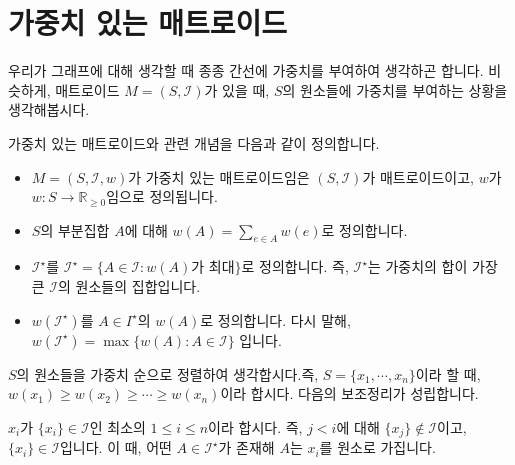\documentclass[11pt, a4paper]{book}
\newcommand{\I}{\mathcal{I}}
\begin{document}
    \section{가중치 있는 매트로이드}
    
    우리가 그래프에 대해 생각할 때 종종 간선에 가중치를 부여하여 생각하곤 합니다. 비슷하게, 매트로이드 $M = (S, \I)$가 있을 때, $S$의 원소들에 가중치를 부여하는 상황을 생각해봅시다.
    
    \begin{MLDef}
        가중치 있는 매트로이드와 관련 개념을 다음과 같이 정의합니다.
        \begin{itemize}
            \item $M = (S, \I, w)$가 가중치 있는 매트로이드임은 $(S, \I)$가 매트로이드이고, $w$가 $w : S \to \mathbb{R}_{\ge 0}$임으로 정의됩니다.
            \item $S$의 부분집합 $A$에 대해 $w(A) = \sum_{e \in A} w(e)$로 정의합니다.
            \item $\I^{\star}$를 $\I^{\star} = \{ A \in \I : w(A)\text{가 최대} \}$로 정의합니다. 즉, $\I^{\star}$는 가중치의 합이 가장 큰 $\I$의 원소들의 집합입니다.
            \item $w(\I^{\star})$를 $A \in I^{\star}$의 $w(A)$로 정의합니다. 다시 말해, $w(\I^{\star}) = \max \{ w(A) : A \in \I \}$ 입니다.
        \end{itemize}
    \end{MLDef}
    
    $S$의 원소들을 가중치 순으로 정렬하여 생각합시다.즉, $S = \{x_1, \cdots, x_n \}$이라 할 때, $w(x_1) \ge w(x_2) \ge \cdots \ge w(x_n)$이라 합시다. 다음의 보조정리가 성립합니다.
    
    \begin{MLLem}
        $x_i$가 $\{x_i\} \in \I$인 최소의 $1 \le i \le n$이라 합시다. 즉, $j < i$에 대해 $\{x_j\} \not\in \I$이고, $\{x_i\} \in \I$입니다. 이 때, 어떤 $A \in \I^\star$가 존재해 $A$는 $x_i$를 원소로 가집니다.
    \end{MLLem}
    
\end{document}
